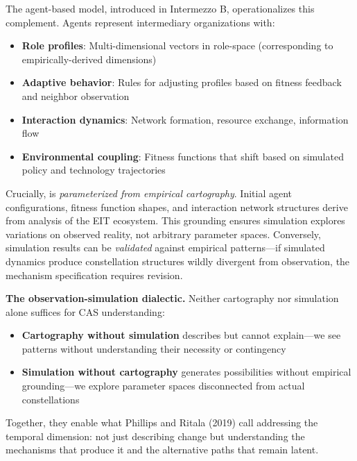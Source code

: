\documentclass[../main.tex]{subfiles}
\begin{document}
The \RoleSim agent-based model, introduced in Intermezzo B, operationalizes this complement. Agents represent intermediary organizations with:
\begin{itemize}[leftmargin=*, itemsep=0.1em]
\item \textbf{Role profiles}: Multi-dimensional vectors in role-space (corresponding to empirically-derived dimensions)
\item \textbf{Adaptive behavior}: Rules for adjusting profiles based on fitness feedback and neighbor observation
\item \textbf{Interaction dynamics}: Network formation, resource exchange, information flow
\item \textbf{Environmental coupling}: Fitness functions that shift based on simulated policy and technology trajectories
\end{itemize}

Crucially, \RoleSim is \emph{parameterized from empirical cartography}. Initial agent configurations, fitness function shapes, and interaction network structures derive from \RoleBox analysis of the EIT ecosystem. This grounding ensures simulation explores variations on observed reality, not arbitrary parameter spaces. Conversely, simulation results can be \emph{validated} against empirical patterns---if simulated dynamics produce constellation structures wildly divergent from observation, the mechanism specification requires revision.

\begin{importantbox}
\textbf{The observation-simulation dialectic.} Neither cartography nor simulation alone suffices for CAS understanding:
\begin{itemize}[leftmargin=*, itemsep=0.1em]
\item \textbf{Cartography without simulation} describes but cannot explain---we see patterns without understanding their necessity or contingency
\item \textbf{Simulation without cartography} generates possibilities without empirical grounding---we explore parameter spaces disconnected from actual constellations
\end{itemize}
Together, they enable what Phillips and Ritala (2019) call addressing the temporal dimension: not just describing change but understanding the mechanisms that produce it and the alternative paths that remain latent.
\end{importantbox}
\end{document}
